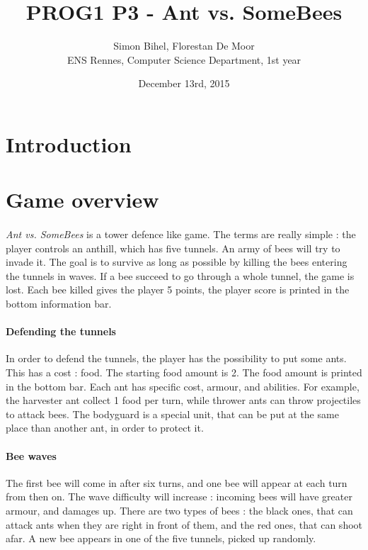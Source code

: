 \documentclass[a4paper]{article}
\begin{document}
\title{PROG1 P3 - Ant vs. SomeBees}
\author{Simon Bihel, Florestan De Moor \\ ENS Rennes, Computer Science Department, 1st year}
\date{December 13rd, 2015}

\newcommand{\this}{\emph{Ant vs. SomeBees }}

\maketitle

\section*{Introduction}


\section{Game overview}

\paragraph{} \this is a tower defence like game. The terms are really simple : the player controls an anthill, which has five tunnels. An army of bees will try to invade it. The goal is to survive as long as possible by killing the bees entering the tunnels in waves. If a bee succeed to go through a whole tunnel, the game is lost. Each bee killed gives the player 5 points, the player score is printed in the bottom information bar.

\paragraph{Defending the tunnels} In order to defend the tunnels, the player has the possibility to put some ants. This has a cost : food. The starting food amount is 2. The food amount is printed in the bottom bar. Each ant has specific cost, armour, and abilities. For example, the harvester ant collect 1 food per turn, while thrower ants can throw projectiles to attack bees. The bodyguard is a special unit, that can be put at the same place than another ant, in order to protect it.

\paragraph{Bee waves} The first bee will come in after six turns, and one bee will appear at each turn from then on. The wave difficulty will increase : incoming bees will have greater armour, and damages up. There are two types of bees : the black ones, that can attack ants when they are right in front of them, and the red ones, that can shoot afar. A new bee appears in one of the five tunnels, picked up randomly.
\end{document}

